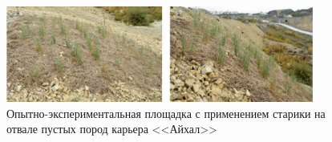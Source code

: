 \begin{figure}
  \begin{center}
    \includegraphics[width=0.9\textwidth]{authors/nekiforov-fig3.jpg}
  \end{center}
  \caption{Опытно-экспериментальная площадка с применением старики на отвале пустых пород карьера <<Айхал>>}
  \label{fig:nekiforov-fig3}
\end{figure}
